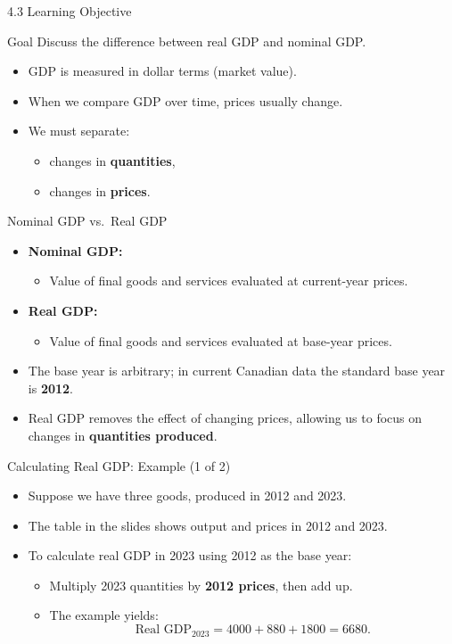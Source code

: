 \documentclass[aspectratio=169]{beamer}
\begin{document}
\begin{frame}{4.3 Learning Objective}
\transfade
\begin{block}{Goal}
Discuss the difference between real GDP and nominal GDP.
\end{block}
\begin{itemize}
  \item GDP is measured in dollar terms (market value).
  \item When we compare GDP over time, prices usually \alert{change}.
  \item We must separate:
  \begin{itemize}
    \item changes in \textbf{quantities},
    \item changes in \textbf{prices}.
  \end{itemize}
\end{itemize}
\end{frame}

\begin{frame}{Nominal GDP vs.\ Real GDP}
\transfade
\begin{itemize}
  \item \textbf{Nominal GDP:}
  \begin{itemize}
    \item Value of final goods and services \alert{evaluated at current-year prices}.
  \end{itemize}
  \item \textbf{Real GDP:}
  \begin{itemize}
    \item Value of final goods and services \alert{evaluated at base-year prices}.
  \end{itemize}
  \item The base year is arbitrary; in current Canadian data the standard base year is \textbf{2012}.
  \item Real GDP removes the effect of changing prices, allowing us to focus on changes in \textbf{quantities produced}.
\end{itemize}
\end{frame}

\begin{frame}{Calculating Real GDP: Example (1 of 2)}
\transfade
\begin{itemize}
  \item Suppose we have three goods, produced in 2012 and 2023.
  \item The table in the slides shows output and prices in 2012 and 2023.
  \item To calculate real GDP in 2023 using 2012 as the base year:
  \begin{itemize}
    \item Multiply 2023 quantities by \textbf{2012 prices}, then add up.
    \item The example yields:  
    \[
      \text{Real GDP}_{2023} = 4000 + 880 + 1800 = 6680.
    \]
  \end{itemize}
\end{itemize}
\end{frame}
\end{document}
